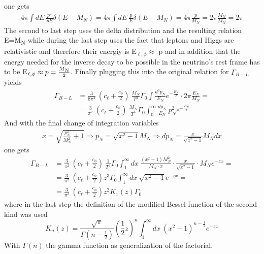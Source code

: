 one gets
\begin{align*}
	4\pi\int dE\: \frac{p^2}{pE}\delta\left(E-M_N\right)=4\pi\int dE\: \frac{p}{E}\delta\left(E-M_N\right)=4\pi\frac{p}{M_N}=2\pi \frac{M_N}{M_N}=2\pi
\end{align*}
The second to last step uses the delta distribution and the resulting relation E=M\textsubscript{N} while during the last step uses the fact that leptons and Higgs are relativistic and therefore their energiy is E$_{\ell,\phi}\approx$ p and in addition that the energy needed for the inverse decay to be possible in the neutrino's rest frame has to be E$_{\ell,\phi}\approx p=\frac{M\textsubscript{N}}{2}$. Finally plugging this into the original relation for $\Gamma_{B-L}$ yields
\begin{align*}
	\Gamma_{B-L}&=\frac{3}{8\pi^4}\:\left(c_\ell+\frac{c_\phi}{2}\right)\:\frac{M_N}{T^3}\Gamma_0\int \frac{d^3p_N}{E_N}e^{-\frac{E_N}{T}} \cdot 2\pi\frac{E_N}{M_N}=\\
	&=\frac{3}{\pi^2}\:\left(c_\ell+\frac{c_\phi}{2}\right)\:\frac{M_N}{T^3}\Gamma_0\int_0^\infty \frac{dp_N}{E_N}\:p_N^2e^{-\frac{E_N}{T}}
\end{align*}
And with the final change of integration variables 
\begin{align*}
	x=\sqrt{\frac{p_N^2}{M_N^2}+1}\Longrightarrow p_N=\sqrt{x^2-1}M_N \Longrightarrow dp_N=\frac{x}{\sqrt{x^2-1}}M_Ndx
\end{align*}
one gets 
\begin{align*}
	\Gamma_{B-L}&=\frac{3}{\pi^2}\:\left(c_\ell+\frac{c_\phi}{2}\right)\:\frac{1}{T^3}\Gamma_0\int_{1}^{\infty}dx\: \frac{\left(x^2-1 \right)M_N^2}{M_N\cdot x}\cdot \frac{x}{\sqrt{x^2-1}}\cdot M_N e^{-zx}=\\
	&=\frac{3}{\pi^2}\:\left(c_\ell+\frac{c_\phi}{2}\right)z^3\Gamma_0\int_{1}^{\infty}dx\: \sqrt{x^2-1}e^{-zx}=\\
	&=\frac{3}{\pi^2}\:\left(c_\ell+\frac{c_\phi}{2}\right)z^2K_1(z)\Gamma_0
\end{align*}
where in the last step the definition of the modified Bessel function of the second kind was used
\begin{equation*}
	K_n(z)=\frac{\sqrt{\pi}}{\Gamma\left(n-\frac{1}{2}\right)}\left(\frac{1}{2}z\right)^n\int_{1}^{\infty}dx\:\left(x^2-1\right)^{n-\frac{1}{2}}e^{-zx}
\end{equation*}
With $\Gamma(n)$ the gamma function as generalization of the factorial.
\newpage
